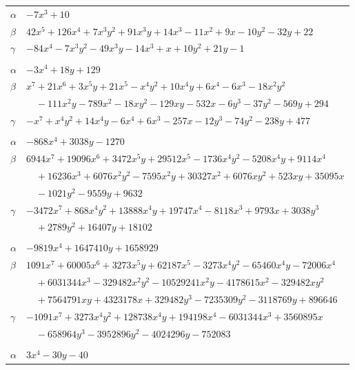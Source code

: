 \documentclass[11pt]{article}
\begin{document}
\begin{longtable}{@{}ll@{}}
$\alpha$ & $-7x^{3}+10$\\
$\beta$ & $42x^{5}+126x^{4}+7x^{3}y^{2}+91x^{3}y+14x^{3}-11x^{2}+9x-10y^{2}-32y+22$\\
$\gamma$ & $-84x^{4}-7x^{3}y^{2}-49x^{3}y-14x^{3}+x+10y^{2}+21y-1$\\
\addlinespace[3pt]
\multicolumn{2}{@{}l}{$\{i,j\}=\{30,106\}$, $k_{ij}=2^{2}\cdot 3^{2}\cdot 5^{2}$}\\
$\alpha$ & $-3x^{4}+18y+129$\\
$\beta$ & $x^{7}+21x^{6}+3x^{5}y+21x^{5}-x^{4}y^{2}+10x^{4}y+6x^{4}-6x^{3}-18x^{2}y^{2}$\\
 & $\quad -111x^{2}y-789x^{2}-18xy^{2}-129xy-532x-6y^{3}-37y^{2}-569y+294$\\
$\gamma$ & $-x^{7}+x^{4}y^{2}+14x^{4}y-6x^{4}+6x^{3}-257x-12y^{3}-74y^{2}-238y+477$\\
\addlinespace[3pt]
\multicolumn{2}{@{}l}{$\{i,j\}=\{31,59\}$, $k_{ij}=2^{5}\cdot 3^{2}\cdot 5^{2}$}\\
$\alpha$ & $-868x^{4}+3038y-1270$\\
$\beta$ & $6944x^{7}+19096x^{6}+3472x^{5}y+29512x^{5}-1736x^{4}y^{2}-5208x^{4}y+9114x^{4}$\\
 & $\quad +16236x^{3}+6076x^{2}y^{2}-7595x^{2}y+30327x^{2}+6076xy^{2}+523xy+35095x$\\
 & $\quad -1021y^{2}-9559y+9632$\\
$\gamma$ & $-3472x^{7}+868x^{4}y^{2}+13888x^{4}y+19747x^{4}-8118x^{3}+9793x+3038y^{3}$\\
 & $\quad +2789y^{2}+16407y+18102$\\
\addlinespace[3pt]
\multicolumn{2}{@{}l}{$\{i,j\}=\{31,85\}$, $k_{ij}=2^{3}\cdot 3\cdot 5^{2}\cdot 17$}\\
$\alpha$ & $-9819x^{4}+1647410y+1658929$\\
$\beta$ & $1091x^{7}+60005x^{6}+3273x^{5}y+62187x^{5}-3273x^{4}y^{2}-65460x^{4}y-72006x^{4}$\\
 & $\quad +6031344x^{3}-329482x^{2}y^{2}-10529241x^{2}y-4178615x^{2}-329482xy^{2}$\\
 & $\quad +7564791xy+4323178x+329482y^{3}-7235309y^{2}-3118769y+896646$\\
$\gamma$ & $-1091x^{7}+3273x^{4}y^{2}+128738x^{4}y+194198x^{4}-6031344x^{3}+3560895x$\\
 & $\quad -658964y^{3}-3952896y^{2}-4024296y-752083$\\
\addlinespace[3pt]
\multicolumn{2}{@{}l}{$\{i,j\}=\{31,107\}$, $k_{ij}=2\cdot 5$}\\
$\alpha$ & $3x^{4}-30y-40$\\

\end{longtable}
\end{document}
